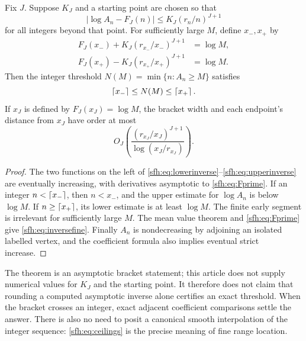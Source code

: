 \begin{theorem}\label{sfh:thm:inverse}
Fix $J$. Suppose $K_J$ and a starting point are chosen so that
\[
 |\log A_n-F_J(n)|\le K_J(r_n/n)^{J+1}
\]
for all integers beyond that point. For sufficiently large $M$, define $x_-,x_+$ by
\begin{align}
 F_J(x_-)+K_J(r_{x_-}/x_-)^{J+1}&=\log M,\label{sfh:eq:lowerinverse}\\
 F_J(x_+)-K_J(r_{x_+}/x_+)^{J+1}&=\log M.\label{sfh:eq:upperinverse}
\end{align}
Then the integer threshold $N(M)=\min\{n:A_n\ge M\}$ satisfies
\begin{equation}\label{sfh:eq:ceilings}
 \left\lceil x_-\right\rceil\le N(M)\le\left\lceil x_+\right\rceil.
\end{equation}
If $x_J$ is defined by $F_J(x_J)=\log M$, the bracket width and each endpoint's distance from $x_J$ have order at most
\begin{equation}\label{sfh:eq:inversefine}
 O_J\left(\frac{(r_{x_J}/x_J)^{J+1}}{\log(x_J/r_{x_J})}\right).
\end{equation}
\end{theorem}
\begin{proof}
The two functions on the left of \eqref{sfh:eq:lowerinverse}--\eqref{sfh:eq:upperinverse} are eventually increasing, with derivatives asymptotic to \eqref{sfh:eq:Fprime}. If an integer $n<\left\lceil x_-\right\rceil$, then $n<x_-$, and the upper estimate for $\log A_n$ is below $\log M$. If $n\ge\left\lceil x_+\right\rceil$, its lower estimate is at least $\log M$. The finite early segment is irrelevant for sufficiently large $M$. The mean value theorem and \eqref{sfh:eq:Fprime} give \eqref{sfh:eq:inversefine}. Finally $A_n$ is nondecreasing by adjoining an isolated labelled vertex, and the coefficient formula also implies eventual strict increase.
\end{proof}

The theorem is an asymptotic bracket statement; this article does not supply numerical values for $K_J$ and the starting point. It therefore does not claim that rounding a computed asymptotic inverse alone certifies an exact threshold. When the bracket crosses an integer, exact adjacent coefficient comparisons settle the answer. There is also no need to posit a canonical smooth interpolation of the integer sequence: \eqref{sfh:eq:ceilings} is the precise meaning of fine range location.

